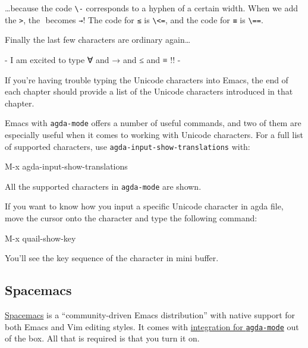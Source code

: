 \ldots because the code \texttt{\textbackslash{}-} corresponds to a
hyphen of a certain width. When we add the \texttt{\textgreater{}}, the
\texttt{­} becomes \texttt{→}! The code for \texttt{≤} is
\texttt{\textbackslash{}\textless{}=}, and the code for \texttt{≡} is
\texttt{\textbackslash{}==}.

\begin{myDisplay}
{- I am excited to type ∀ and → and ≤ and ≡
\end{myDisplay}

Finally the last few characters are ordinary again\ldots{}

\begin{myDisplay}
{- I am excited to type ∀ and → and ≤ and ≡ !! -}
\end{myDisplay}

If you're having trouble typing the Unicode characters into Emacs, the
end of each chapter should provide a list of the Unicode characters
introduced in that chapter.

Emacs with \texttt{agda-mode} offers a number of useful commands, and
two of them are especially useful when it comes to working with Unicode
characters. For a full list of supported characters, use
\texttt{agda-input-show-translations} with:

\begin{myDisplay}
M-x agda-input-show-translations
\end{myDisplay}

All the supported characters in \texttt{agda-mode} are shown.

If you want to know how you input a specific Unicode character in agda
file, move the cursor onto the character and type the following command:

\begin{myDisplay}
M-x quail-show-key
\end{myDisplay}

You'll see the key sequence of the character in mini buffer.

\hypertarget{spacemacs}{%
\subsection{Spacemacs}\label{spacemacs}}

\href{https://www.spacemacs.org/}{Spacemacs} is a ``community-driven
Emacs distribution'' with native support for both Emacs and Vim editing
styles. It comes with
\href{https://develop.spacemacs.org/layers/+lang/agda/README.html}{integration
for \texttt{agda-mode}} out of the box. All that is required is that you
turn it on.

